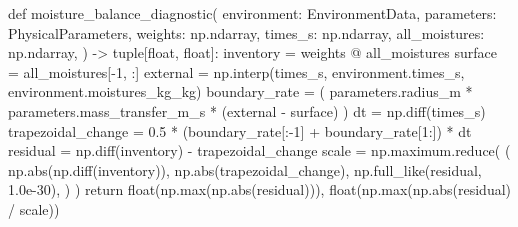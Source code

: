 \documentclass[withoutpreface,bwprint]{cumcmthesis}
\begin{document}
\begin{PythonCode}
def moisture_balance_diagnostic(
    environment: EnvironmentData,
    parameters: PhysicalParameters,
    weights: np.ndarray,
    times_s: np.ndarray,
    all_moistures: np.ndarray,
) -> tuple[float, float]:
    inventory = weights @ all_moistures
    surface = all_moistures[-1, :]
    external = np.interp(times_s, environment.times_s, environment.moistures_kg_kg)
    boundary_rate = (
        parameters.radius_m
        * parameters.mass_transfer_m_s
        * (external - surface)
    )
    dt = np.diff(times_s)
    trapezoidal_change = 0.5 * (boundary_rate[:-1] + boundary_rate[1:]) * dt
    residual = np.diff(inventory) - trapezoidal_change
    scale = np.maximum.reduce(
        (
            np.abs(np.diff(inventory)),
            np.abs(trapezoidal_change),
            np.full_like(residual, 1.0e-30),
        )
    )
    return float(np.max(np.abs(residual))), float(np.max(np.abs(residual) / scale))



\end{PythonCode}
\end{document}
